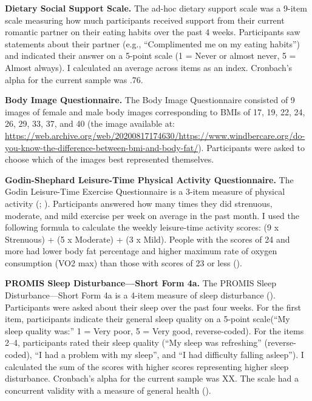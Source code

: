 \documentclass[
]{udthesis}
\begin{document}
\textbf{Dietary Social Support Scale.} The ad-hoc dietary support scale was a 9-item scale measuring how much participants received support from their current romantic partner on their eating habits over the past 4 weeks. Participants saw statements about their partner (e.g., ``Complimented me on my eating habits'') and indicated their answer on a 5-point scale (1 = Never or almost never, 5 = Almost always). I calculated an average across items as an index. Cronbach's alpha for the current sample was .76.

\textbf{Body Image Questionnaire.} The Body Image Questionnaire consisted of 9 images of female and male body images corresponding to BMIs of 17, 19, 22, 24, 26, 29, 33, 37, and 40 (the image available at: \url{https://web.archive.org/web/20200817174630/https://www.windbercare.org/do-you-know-the-difference-between-bmi-and-body-fat/}). Participants were asked to choose which of the images best represented themselves.

\textbf{Godin-Shephard Leisure-Time Physical Activity Questionnaire.} The Godin Leisure-Time Exercise Questionnaire is a 3-item measure of physical activity (; ). Participants answered how many times they did strenuous, moderate, and mild exercise per week on average in the past month. I used the following formula to calculate the weekly leisure-time activity scores: (9 x Strenuous) + (5 x Moderate) + (3 x Mild). People with the scores of 24 and more had lower body fat percentage and higher maximum rate of oxygen consumption (VO2 max) than those with scores of 23 or less ().

\textbf{PROMIS Sleep Disturbance---Short Form 4a.} The PROMIS Sleep Disturbance---Short Form 4a is a 4-item measure of sleep disturbance (). Participants were asked about their sleep over the past four weeks. For the first item, participants indicate their general sleep quality on a 5-point scale(``My sleep quality was:'' 1 = Very poor, 5 = Very good, reverse-coded). For the items 2--4, participants rated their sleep quality (``My sleep was refreshing'' (reverse-coded), ``I had a problem with my sleep'', and ``I had difficulty falling asleep''). I calculated the sum of the scores with higher scores representing higher sleep disturbance. Cronbach's alpha for the current sample was XX. The scale had a concurrent validity with a measure of general health ().
\end{document}
